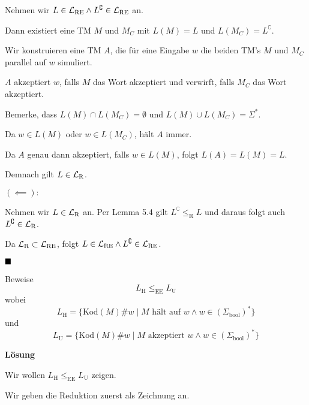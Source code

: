                 Nehmen wir $L \in \mathcal{L}_\text{RE} \land L^\complement \in \mathcal{L}_\text{RE}$ an.
            
                Dann existiert eine TM $M$ und $M_C$ mit $L(M) = L$ und $L(M_C) = L^\complement$.
            
                Wir konstruieren eine TM $A$, die für eine Eingabe $w$ die beiden TM's $M$ und $M_C$ parallel auf $w$ simuliert.
                
                $A$ akzeptiert $w$, falls $M$ das Wort akzeptiert und verwirft, falls $M_C$ das Wort akzeptiert.
                
                Bemerke, dass $L(M) \cap L(M_C) = \emptyset$ und $L(M) \cup L(M_C) = \Sigma^*$.
            
                Da $w \in L(M)$ oder $w \in L(M_C)$, hält $A$ immer.
            
                Da $A$ genau dann akzeptiert, falls $w \in L(M)$, folgt $L(A) = L(M) = L$.
            
                Demnach gilt $L \in \mathcal{L}_\text{R}$.
            
                
                $\mathbf{(\impliedby):}$
            
                Nehmen wir $L \in \mathcal{L}_\text{R}$ an. Per Lemma 5.4 gilt $L^\complement \leq_{\text{R}} L$ und daraus folgt auch $L^\complement \in \mathcal{L}_\text{R}$.
            
                Da $\mathcal{L}_\text{R} \subset \mathcal{L}_\text{RE}$, folgt $L \in \mathcal{L}_\text{RE} \land L^\complement \in \mathcal{L}_\text{RE}$.
            
                $\hfill\blacksquare$
            
            



                Beweise $$L_{\text{H}} \leq_{\text{EE}} L_{\text{U}}$$
                wobei 
                $$L_{\text{H}} = \{\text{Kod}(M)\#w \mid M\text{ hält auf }w\land w \in (\Sigma_{\text{bool}})^*\}$$
                und 
                $$L_{\text{U}}=\{\text{Kod}(M)\#w \mid M \text{ akzeptiert }w \land w \in (\Sigma_{\text{bool}})^*\}$$
            
            
                \textbf{Lösung}
            
                Wir wollen $L_{\text{H}} \leq_{\text{EE}} L_{\text{U}}$ zeigen.
            
                    Wir geben die Reduktion zuerst als Zeichnung an.
            
